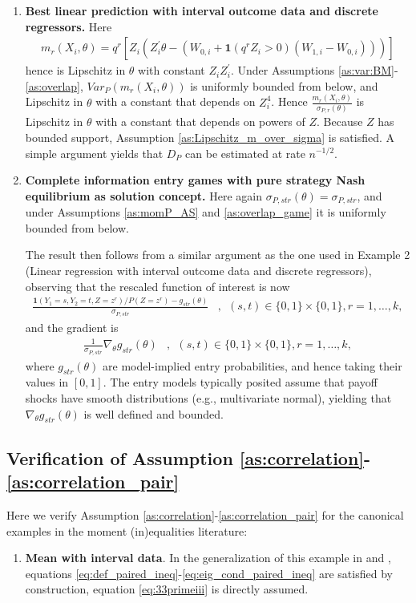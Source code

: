 \documentclass[letterpaper,11pt]{article}
\theoremstyle{myplain}
\theoremstyle{mydefinition}
\theoremstyle{myremark}
\renewcommand{\cite}{\citet}
\numberwithin{equation}{section}
\numberwithin{figure}{section}
\begin{document}
\begin{appendices}
\begin{enumerate}
\item \textbf{Best linear prediction with interval outcome data and discrete regressors.} Here 
\begin{align}
m_r(X_i,\theta)=q^r [Z_i(Z_i^\prime \theta -(W_{0,i}+\mathbf{1}(q^rZ_i>0)(W_{1,i}-W_{0,i})))]
\end{align}
hence is Lipschitz in $\theta$ with constant $Z_iZ_i^\prime$. Under Assumptions \ref{as:var:BM}-\ref{as:overlap}, $Var_P(m_r(X_i,\theta))$ is uniformly bounded from below, and Lipschitz in $\theta$ with a constant that depends on $Z_i^4$. Hence $\frac{m_r(X_i,\theta)}{\sigma_{P,r}(\theta)}$ is Lipschitz in $\theta$ with a constant that depends on powers of $Z$. Because $Z$ has bounded support, Assumption \ref{as:Lipschitz_m_over_sigma} is satisfied. A simple argument yields that $D_P$ can be estimated at rate $n^{-1/2}$.
\item \textbf{Complete information entry games with pure strategy Nash equilibrium as solution concept.} Here again $\sigma_{P,st r}(\theta)=\sigma_{P,str}$, and under Assumptions \ref{as:momP_AS} and \ref{as:overlap_game} it is uniformly bounded from below. 





The result then follows from a similar argument as the one used in Example 2 (Linear regression with interval outcome data and discrete regressors), observing that the rescaled function of interest is now
\begin{align*}
\frac{\mathbf{1}(Y_1=s,Y_2=t,Z=z^r)/P(Z=z^r)-g_{str}(\theta)}{\sigma_{P,str}}&,~~(s,t)\in \{0,1\}\times\{0,1\},r=1,\dots,k,
\end{align*}
and the gradient is
\begin{align*}
\frac{1}{\sigma_{P,str}}\nabla_\theta g_{str}(\theta) &,~~(s,t)\in \{0,1\}\times\{0,1\},r=1,\dots,k,
\end{align*}
where $g_{str}(\theta)$ are model-implied entry probabilities, and hence taking their values in $[0,1]$. The entry models typically posited assume that payoff shocks have smooth distributions (e.g., multivariate normal), yielding that $\nabla_\theta g_{str}(\theta)$ is well defined and bounded.
\end{enumerate}


\subsection{Verification of Assumption \ref{as:correlation}-\ref{as:correlation_pair}}
\label{sec:verify_3.3}
Here we verify Assumption \ref{as:correlation}-\ref{as:correlation_pair} for the canonical examples in the moment (in)equalities literature:
\begin{enumerate}
\item \textbf{Mean with interval data}. In the generalization of this example in \cite{ImbensManski04} and \cite{Stoye09}, equations \eqref{eq:def_paired_ineq}-\eqref{eq:eig_cond_paired_ineq} are satisfied by construction, equation \eqref{eq:33primeiii} is directly assumed.


\end{enumerate}
\end{appendices}
\end{document}
